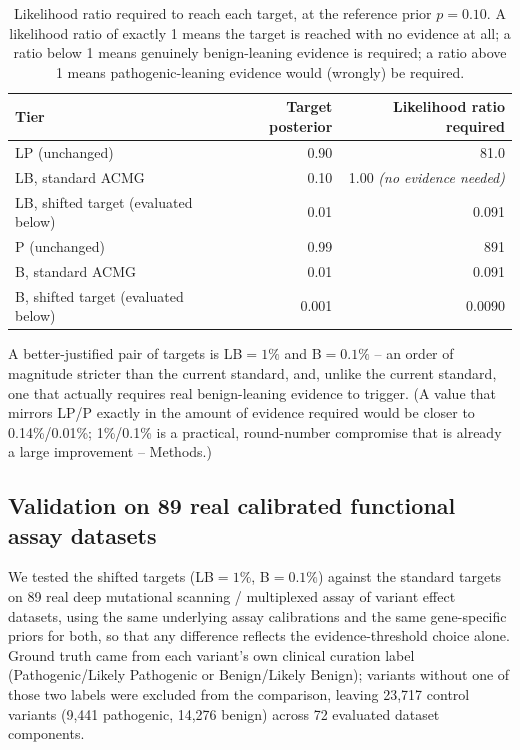 \documentclass[11pt]{article}
\begin{document}
\begin{table}[h]
\centering
\caption{Likelihood ratio required to reach each target, at the reference
         prior $p=0.10$. A likelihood ratio of exactly 1 means the target is
         reached with no evidence at all; a ratio below 1 means genuinely
         benign-leaning evidence is required; a ratio above 1 means
         pathogenic-leaning evidence would (wrongly) be required.}
\label{tab:target_symmetry}
\begin{tabular}{lrr}
\toprule
Tier & Target posterior & Likelihood ratio required \\
\midrule
LP (unchanged)                    & 0.90    & 81.0 \\
LB, standard ACMG                 & 0.10    & 1.00 \emph{(no evidence needed)} \\
LB, shifted target (evaluated below) & 0.01 & 0.091 \\
P (unchanged)                     & 0.99    & 891 \\
B, standard ACMG                  & 0.01    & 0.091 \\
B, shifted target (evaluated below) & 0.001 & 0.0090 \\
\bottomrule
\end{tabular}
\end{table}

A better-justified pair of targets is LB$=1\%$ and B$=0.1\%$ -- an order of
magnitude stricter than the current standard, and, unlike the current
standard, one that actually requires real benign-leaning evidence to
trigger. (A value that mirrors LP/P exactly in the amount of evidence
required would be closer to 0.14\%/0.01\%; 1\%/0.1\% is a practical,
round-number compromise that is already a large improvement -- Methods.)

\subsection*{Validation on 89 real calibrated functional assay datasets}
\label{sec:results-validation}

We tested the shifted targets (LB$=1\%$, B$=0.1\%$) against the standard
targets on 89 real deep mutational scanning / multiplexed assay of variant
effect datasets, using the same underlying assay calibrations and the same
gene-specific priors for both, so that any difference reflects the
evidence-threshold choice alone. Ground truth came from each variant's own
clinical curation label (Pathogenic/Likely Pathogenic or Benign/Likely
Benign); variants without one of those two labels were excluded from the
comparison, leaving 23{,}717 control variants (9{,}441 pathogenic, 14{,}276
benign) across 72 evaluated dataset components.
\end{document}
